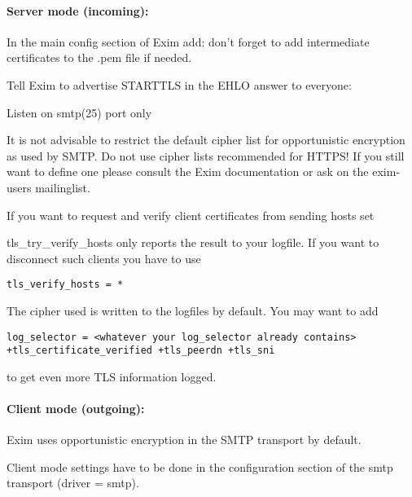 \paragraph{Server mode (incoming):}
In the main config section of Exim add:
don't forget to add intermediate certificates to the .pem file if needed.

Tell Exim to advertise STARTTLS in the EHLO answer to everyone:

Listen on smtp(25) port only

It is not advisable to restrict the default cipher list for opportunistic encryption as used by SMTP. Do not use cipher lists recommended for HTTPS! If you still want to define one please consult the Exim documentation or ask on the exim-users mailinglist.

If you want to request and verify client certificates from sending hosts set

tls\_try\_verify\_hosts only reports the result to your logfile. If you want to disconnect such clients you have to use
\begin{lstlisting}
tls_verify_hosts = *
\end{lstlisting}

The cipher used is written to the logfiles by default. You may want to add
\begin{lstlisting}
log_selector = <whatever your log_selector already contains> +tls_certificate_verified +tls_peerdn +tls_sni
\end{lstlisting}
to get even more TLS information logged.

\paragraph{Client mode (outgoing):}
Exim uses opportunistic encryption in the SMTP transport by default.

Client mode settings have to be done in the configuration section of the smtp transport (driver = smtp).

